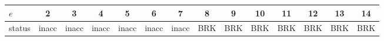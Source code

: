 \begin{tabular}{lccccccccccccc}
\toprule
$e$ & 2 & 3 & 4 & 5 & 6 & 7 & 8 & 9 & 10 & 11 & 12 & 13 & 14\\
\midrule
status & \cellcolor{orange!30}inacc & \cellcolor{orange!30}inacc & \cellcolor{orange!30}inacc & \cellcolor{orange!30}inacc & \cellcolor{orange!30}inacc & \cellcolor{orange!30}inacc & \cellcolor{red!25}BRK & \cellcolor{red!25}BRK & \cellcolor{red!25}BRK & \cellcolor{red!25}BRK & \cellcolor{red!25}BRK & \cellcolor{red!25}BRK & \cellcolor{red!25}BRK\\
\bottomrule
\end{tabular}
